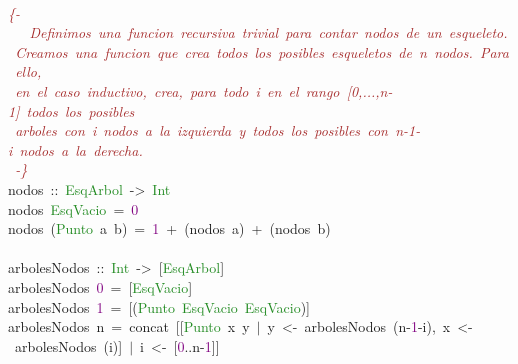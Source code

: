 \begin{allintypewriter}
\mbox{} \\
\mbox{}\textit{\textcolor{Brown}{\{-}} \\
\mbox{}\textit{\textcolor{Brown}{\ \ \ Definimos\ una\ funcion\ recursiva\ trivial\ para\ contar\ nodos\ de\ un\ esqueleto.}} \\
\mbox{}\textit{\textcolor{Brown}{\ Creamos\ una\ funcion\ que\ crea\ todos\ los\ posibles\ esqueletos\ de\ n\ nodos.\ Para\ ello,}} \\
\mbox{}\textit{\textcolor{Brown}{\ en\ el\ caso\ inductivo,\ crea,\ para\ todo\ i\ en\ el\ rango\ [0,...,n-1]\ todos\ los\ posibles\ }} \\
\mbox{}\textit{\textcolor{Brown}{\ arboles\ con\ i\ nodos\ a\ la\ izquierda\ y\ todos\ los\ posibles\ con\ n-1-i\ nodos\ a\ la\ derecha.}} \\
\mbox{}\textit{\textcolor{Brown}{\ -\}}} \\
\mbox{}nodos\ \textcolor{BrickRed}{::}\ \textcolor{ForestGreen}{EsqArbol}\ \textcolor{BrickRed}{-\textgreater{}}\ \textcolor{ForestGreen}{Int}\  \\
\mbox{}nodos\ \textcolor{ForestGreen}{EsqVacio}\ \textcolor{BrickRed}{=}\ \textcolor{Purple}{0} \\
\mbox{}nodos\ \textcolor{BrickRed}{(}\textcolor{ForestGreen}{Punto}\ a\ b\textcolor{BrickRed}{)}\ \textcolor{BrickRed}{=}\ \textcolor{Purple}{1}\ \textcolor{BrickRed}{+}\ \textcolor{BrickRed}{(}nodos\ a\textcolor{BrickRed}{)}\ \textcolor{BrickRed}{+}\ \textcolor{BrickRed}{(}nodos\ b\textcolor{BrickRed}{)} \\
\mbox{} \\
\mbox{}arbolesNodos\ \textcolor{BrickRed}{::}\ \textcolor{ForestGreen}{Int}\ \textcolor{BrickRed}{-\textgreater{}}\ \textcolor{BrickRed}{[}\textcolor{ForestGreen}{EsqArbol}\textcolor{BrickRed}{]} \\
\mbox{}arbolesNodos\ \textcolor{Purple}{0}\ \textcolor{BrickRed}{=}\ \textcolor{BrickRed}{[}\textcolor{ForestGreen}{EsqVacio}\textcolor{BrickRed}{]} \\
\mbox{}arbolesNodos\ \textcolor{Purple}{1}\ \textcolor{BrickRed}{=}\ \textcolor{BrickRed}{[(}\textcolor{ForestGreen}{Punto}\ \textcolor{ForestGreen}{EsqVacio}\ \textcolor{ForestGreen}{EsqVacio}\textcolor{BrickRed}{)]} \\
\mbox{}arbolesNodos\ n\ \textcolor{BrickRed}{=}\ concat\ \textcolor{BrickRed}{[[}\textcolor{ForestGreen}{Punto}\ x\ y\ \textcolor{BrickRed}{$|$}\ y\ \textcolor{BrickRed}{\textless{}-}\ arbolesNodos\ \textcolor{BrickRed}{(}n\textcolor{BrickRed}{-}\textcolor{Purple}{1}\textcolor{BrickRed}{-}i\textcolor{BrickRed}{),}\ x\ \textcolor{BrickRed}{\textless{}-}\ arbolesNodos\ \textcolor{BrickRed}{(}i\textcolor{BrickRed}{)]}\ \textcolor{BrickRed}{$|$}\ i\ \textcolor{BrickRed}{\textless{}-}\ \textcolor{BrickRed}{[}\textcolor{Purple}{0}\textcolor{BrickRed}{..}n\textcolor{BrickRed}{-}\textcolor{Purple}{1}\textcolor{BrickRed}{]]} \\

\end{allintypewriter}

